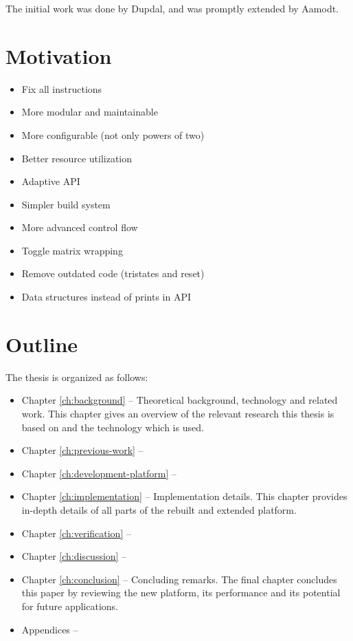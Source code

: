 \TODO

The initial work was done by Dupdal, and was promptly extended by Aamodt.

\section{Motivation}


\begin{itemize}
    \item Fix all instructions
    \item More modular and maintainable
    \item More configurable (not only powers of two)
    \item Better resource utilization
    \item Adaptive API
    \item Simpler build system
    \item More advanced control flow
    \item Toggle matrix wrapping
    \item Remove outdated code (tristates and reset)
    \item Data structures instead of prints in API
\end{itemize}

\section{Outline}

\TODO
The thesis is organized as follows:

\begin{itemize}
    \item Chapter \ref{ch:background} –
        Theoretical background, technology and related work.
        This chapter gives an overview of the relevant research this thesis is based on and the technology which is used.
    \item Chapter \ref{ch:previous-work} –
        \TODO
    \item Chapter \ref{ch:development-platform} –
        \TODO
    \item Chapter \ref{ch:implementation} –
        Implementation details.
        This chapter provides in-depth details of all parts of the rebuilt and extended platform.
        \TODO
    \item Chapter \ref{ch:verification} –
        \TODO
    \item Chapter \ref{ch:discussion} –
        \TODO
    \item Chapter \ref{ch:conclusion} –
        Concluding remarks.
        The final chapter concludes this paper by reviewing the new platform, its performance and its potential for future applications.
    \item Appendices –
        \TODO
\end{itemize}
